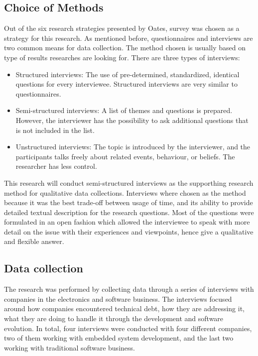\subsection{Choice of Methods}
Out of the six research strategies presented by Oates\cite{Oates:2006:RIS:1202299}, survey was chosen as a strategy for this research. As mentioned before, questionnaires and interviews are two common means for data collection\cite{Wohlin:2000:ESE:330775}. The method chosen is usually based on type of results researches are looking for. There are three types of interviews\cite{Oates:2006:RIS:1202299}:
\begin{itemize}
	\item Structured interviews: The use of pre-determined, standardized, identical questions for every interviewee. Structured interviews are very similar to questionnaires.
	\item Semi-structured interviews: A list of themes and questions is prepared. However, the interviewer has the possibility to ask additional questions that is not included in the list.
	\item Unstructured interviews: The topic is introduced by the interviewer, and the participants talks freely about related events, behaviour, or beliefs. The researcher has less control. 
\end{itemize}

This research will conduct semi-structured interviews as the supporthing research method for qualitative data collections. Interviews where chosen as the method because it was the best trade-off between usage of time, and its ability to provide detailed textual description for the research questions. Most of the questions were formulated in an open fashion which allowed the interviewee to speak with more detail on the issue with their experiences and viewpoints\cite{Oates:2006:RIS:1202299,Wohlin:2000:ESE:330775}, hence give a qualitative and flexible answer. 

\subsection{Data collection}
The research was performed by collecting data through a series of interviews with companies in the electronics and software business. The interviews focused around how companies encountered technical debt, how they are addressing it, what they are doing to handle it through the development and software evolution. In total, four interviews were conducted with four different companies, two of them working with embedded system development, and the last two working with traditional software business.


